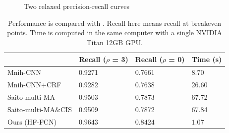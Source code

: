 \documentclass[runningheads]{llncs}
\begin{document}
\begin{figure}
\centering
{}
\caption{Two relaxed precision-recall curves}
\label{fig:}
\end{figure}
 
    \begin{table} 
    \centering
	\caption{Performance is compared with \cite{Mnih2013Machine,Saito2016Multiple}. Recall here  means recall at breakeven points. Time is computed in the same computer with a single NVIDIA Titan 12GB GPU.}
	\begin{tabular}{L{38mm}C{26mm}C{26mm}C{26mm}}     
	\toprule
	& Recall ($\rho$ = 3) & Recall ($\rho$ = 0)& Time (s)\\
	\midrule
	Mnih-CNN \cite{Mnih2013Machine} & 0.9271 & 0.7661 & 8.70  \\ 
	Mnih-CNN+CRF \cite{Mnih2013Machine} & 0.9282 & 0.7638 & 26.60\\ 
	Saito-multi-MA \cite{Saito2016Multiple} & 0.9503 & 0.7873 & 67.72 \\
	Saito-multi-MA$\&$CIS \cite{Saito2016Multiple} & 0.9509 & 0.7872 & 67.84 \\
	Ours (HF-FCN) & $\bm{0.9643}$ & $\bm{0.8424}$ & $\bm{1.07}$\\
	\bottomrule
	\end{tabular}
	\label{tab:PerformanceComparision}
	\end{table}  
 
\end{document}
